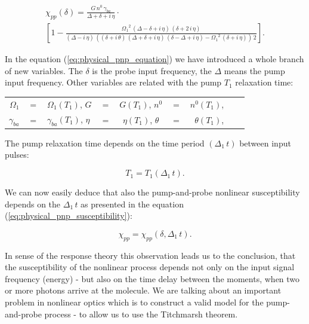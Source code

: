 \documentclass[12pt,twoside,a4paper]{article}
\numberwithin{equation}{subsection}
\numberwithin{figure}{subsection}
\begin{document}
\begin{multline}   \label{eq:physical_pnp_equation}
     \chi_{pp} (\delta ) = \frac {G\,n^{0}\,{\gamma_{ba}}}{\Delta  + \delta  + i\,\eta } \cdot \\
     [1 - \frac {{\Omega_{1}}^{2}\,(\Delta  - \delta  + i\,\eta )\,(\delta  + 2\,i\,\eta )}{(\Delta  - i\,\eta )\,((\delta  + i\,
     \theta)\,(\Delta  + \delta  + i\,\eta )\,(\delta  - \Delta  + i\,\eta ) - {\Omega_{1}}^{2}\,(\delta  + i\,\eta ))\,2}].
\end{multline}

In the equation (\ref{eq:physical_pnp_equation}) we have introduced a whole branch of new variables. The $\delta $ is the probe input frequency, the $\Delta $ means the pump input frequency. Other variables are related with the pump $ T_{1} $ relaxation time:

\begin{tabular} {r c l r c l r c l}
	$ \Omega_{1} $  & $ = $ & $ \Omega_{1} ( T_{1} )$, 
	$ G $           & $ = $ & $  G ( T_{1} )$, 
	$ n^{0} $       & $ = $ & $  n^{0} ( T_{1} )$, \\
	$ \gamma_{ba} $ & $ = $ & $  \gamma_{ba} ( T_{1} )$, 
	$ \eta $        & $ = $ & $  \eta ( T_{1} )$, 
	$ \theta $      & $ = $ & $  \theta ( T_{1} )$, \\
\end{tabular}

The pump relaxation time depends on the time period $( \Delta_1 \, t)$ between input pulses:

\begin{equation} \label{eq:physical_periodtime}
   T_{1} =  T_{1} ( \Delta_1 \, t).
\end{equation}

We can now easily deduce that also the pump-and-probe nonlinear susceptibility depends on the $\Delta_1 \, t $ as presented in the equation
(\ref{eq:physical_pnp_susceptibility}):

\begin{equation} \label{eq:physical_pnp_susceptibility}
  \chi_{pp} = \chi_{pp} (\delta , \Delta_1 \, t).
\end{equation} 

In sense of the response theory this observation leads us to the conclusion, that the susceptibility of the nonlinear process depends not only on the input signal frequency (energy) - but also on the time delay between the moments, when two or more photons arrive at the molecule. We are talking about an important problem in nonlinear optics which is to construct a valid model for the pump-and-probe process - to allow us to use the Titchmarsh theorem. 
\end{document}
